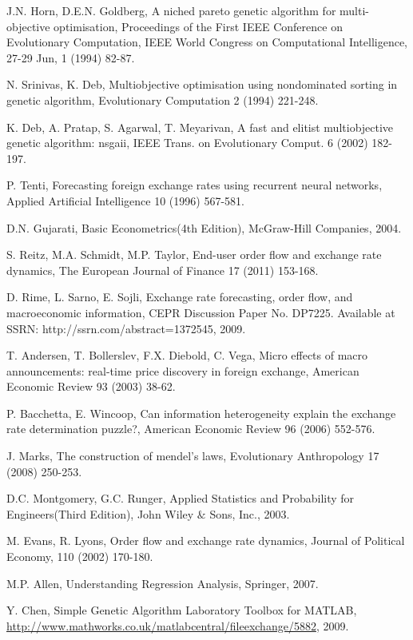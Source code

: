\begin{thebibliography}{00}
 J.N. Horn,  D.E.N. Goldberg,
A niched pareto genetic algorithm for multi-objective
optimisation,
             Proceedings of the First IEEE Conference on Evolutionary Computation, IEEE World Congress on Computational              Intelligence,  27-29 Jun,
              1 (1994) 82-87.

 N. Srinivas, K. Deb,
 Multiobjective optimisation using nondominated sorting in genetic
             algorithm,
             Evolutionary Computation 2 (1994) 221-248.

 K. Deb, A. Pratap, S. Agarwal, T. Meyarivan,
A fast and elitist multiobjective genetic algorithm: nsgaii,
             IEEE Trans. on Evolutionary Comput. 6 (2002) 182-197.

 P. Tenti,
Forecasting foreign exchange rates using recurrent neural
networks, Applied Artificial Intelligence 10 (1996) 567-581. 

 D.N. Gujarati, Basic Econometrics(4th Edition),
McGraw-Hill Companies, 2004.

S. Reitz, M.A. Schmidt, M.P. Taylor, End-user order flow and exchange rate dynamics, The European Journal of Finance 17 (2011) 153-168.  

 D. Rime, L. Sarno, E. Sojli,
 Exchange rate forecasting, order flow, and macroeconomic information, CEPR Discussion Paper No. DP7225. Available at SSRN: http://ssrn.com/abstract=1372545, 2009.

 T. Andersen, T. Bollerslev, F.X. Diebold,
C. Vega, Micro effects of macro announcements: real-time price
discovery in foreign exchange, American Economic Review 93 (2003) 38-62.

 P. Bacchetta, E. Wincoop,
Can information heterogeneity explain the exchange rate determination puzzle?,
American Economic Review 96 (2006) 552-576. 

 J. Marks,
The construction of mendel's laws, Evolutionary Anthropology 17 (2008) 250-253.

 D.C. Montgomery, G.C. Runger, Applied Statistics and Probability for Engineers(Third Edition), John Wiley $\&$ Sons, Inc., 2003.

 M. Evans, R. Lyons,
Order flow and exchange rate dynamics, Journal of Political
Economy, 110 (2002) 170-180. 

 M.P. Allen,
Understanding Regression Analysis, Springer, 2007.

 Y. Chen,
Simple Genetic Algorithm Laboratory Toolbox for MATLAB,
\url{http://www.mathworks.co.uk/matlabcentral/fileexchange/5882}, 2009.

\end{thebibliography}

